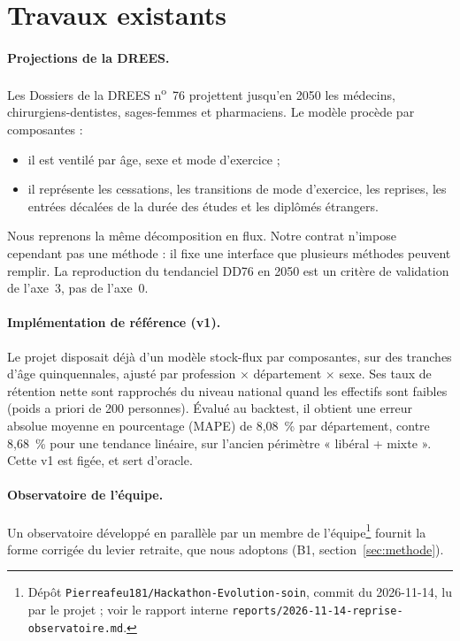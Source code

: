 \documentclass[11pt]{article}
\begin{document}
\section{Travaux existants}

\paragraph{Projections de la DREES.} Les Dossiers de la DREES n\textsuperscript{o}~76
\citep{drees2021dd76} projettent jusqu'en 2050 les médecins, chirurgiens-dentistes, sages-femmes et
pharmaciens. Le modèle procède par composantes :
\begin{itemize}
  \item il est ventilé par âge, sexe et mode d'exercice ;
  \item il représente les cessations, les transitions de mode d'exercice, les reprises, les entrées
        décalées de la durée des études et les diplômés étrangers.
\end{itemize}
Nous reprenons la même décomposition en flux. Notre contrat n'impose cependant pas une méthode : il
fixe une interface que plusieurs méthodes peuvent remplir. La reproduction du tendanciel DD76 en 2050
est un critère de validation de l'axe~3, pas de l'axe~0.

\paragraph{Implémentation de référence (v1).} Le projet disposait déjà d'un modèle stock-flux par
composantes, sur des tranches d'âge quinquennales, ajusté par profession $\times$ département $\times$
sexe. Ses taux de rétention nette sont rapprochés du niveau national quand les effectifs sont faibles
(poids a priori de 200\suppose{} personnes). Évalué au backtest, il obtient une erreur absolue moyenne
en pourcentage (MAPE) de 8,08\mesure{}~\% par département, contre 8,68\mesure{}~\% pour une tendance
linéaire, sur l'ancien périmètre « libéral + mixte ». Cette v1 est figée, et sert d'oracle.

\paragraph{Observatoire de l'équipe.} Un observatoire développé en parallèle par un membre de
l'équipe\footnote{Dépôt \texttt{Pierreafeu181/Hackathon-Evolution-soin}, commit du 2026-11-14, lu par
le projet ; voir le rapport interne \texttt{reports/2026-11-14-reprise-observatoire.md}.} fournit la
forme corrigée du levier retraite, que nous adoptons (B1, section~\ref{sec:methode}).
\end{document}
